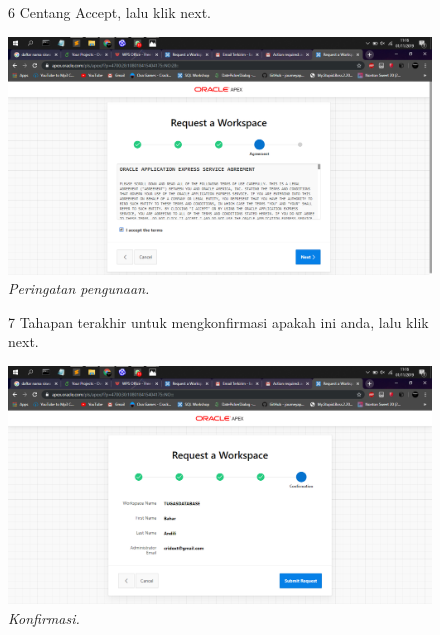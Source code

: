 \begin{enumerate}
\begin{figure}
\label{gambar}
\end{figure}

\begin{figure}
\item[6] Centang Accept, lalu klik next.

    \begin{center}
\includegraphics[scale=0.2]{figures/5.png}
    \caption{\textit{Peringatan pengunaan.}}
        \end{center}

\label{gambar}
\end{figure}

\begin{figure}
\item[7] Tahapan terakhir untuk mengkonfirmasi apakah ini anda, lalu klik next.

    \begin{center}
\includegraphics[scale=0.2]{figures/6.png}
    \caption{\textit{Konfirmasi.}}
        \end{center}
\label{gambar}
\end{figure}


\end{enumerate}
